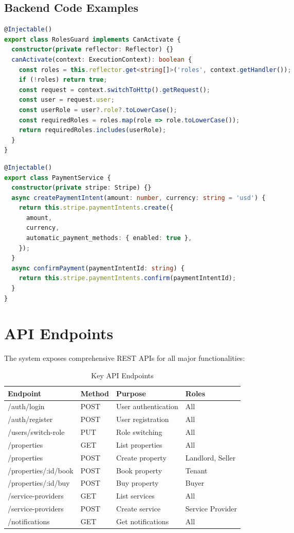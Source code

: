 \documentclass[conference]{IEEEtran}
\begin{document}
\subsection{Backend Code Examples}
\begin{lstlisting}[language=TypeScript, caption=RolesGuard Implementation]
@Injectable()
export class RolesGuard implements CanActivate {
  constructor(private reflector: Reflector) {}
  canActivate(context: ExecutionContext): boolean {
    const roles = this.reflector.get<string[]>('roles', context.getHandler());
    if (!roles) return true;
    const request = context.switchToHttp().getRequest();
    const user = request.user;
    const userRole = user?.role?.toLowerCase();
    const requiredRoles = roles.map(role => role.toLowerCase());
    return requiredRoles.includes(userRole);
  }
}
\end{lstlisting}

\begin{lstlisting}[language=TypeScript, caption=Payment Service]
@Injectable()
export class PaymentService {
  constructor(private stripe: Stripe) {}
  async createPaymentIntent(amount: number, currency: string = 'usd') {
    return this.stripe.paymentIntents.create({
      amount,
      currency,
      automatic_payment_methods: { enabled: true },
    });
  }
  async confirmPayment(paymentIntentId: string) {
    return this.stripe.paymentIntents.confirm(paymentIntentId);
  }
}
\end{lstlisting}

\section{API Endpoints}
The system exposes comprehensive REST APIs for all major functionalities:

\begin{table}[ht]
\centering
\caption{Key API Endpoints}
\begin{tabular}{|l|l|l|l|}
\hline
\textbf{Endpoint} & \textbf{Method} & \textbf{Purpose} & \textbf{Roles} \\
\hline
/auth/login & POST & User authentication & All \\
\hline
/auth/register & POST & User registration & All \\
\hline
/users/switch-role & PUT & Role switching & All \\
\hline
/properties & GET & List properties & All \\
\hline
/properties & POST & Create property & Landlord, Seller \\
\hline
/properties/:id/book & POST & Book property & Tenant \\
\hline
/properties/:id/buy & POST & Buy property & Buyer \\
\hline
/service-providers & GET & List services & All \\
\hline
/service-providers & POST & Create service & Service Provider \\
\hline
/notifications & GET & Get notifications & All \\
\hline
\end{tabular}
\end{table}
\end{document}

